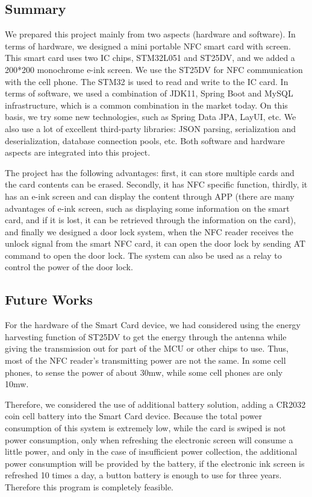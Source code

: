 \documentclass[11pt, a4paper]{article}
\begin{document}
\subsection{Summary}

We prepared this project mainly from two aspects (hardware and software). In terms of hardware, we designed a mini portable NFC smart card with screen. This smart card uses two IC chips, STM32L051 and ST25DV, and we added a 200*200 monochrome e-ink screen. We use the ST25DV for NFC communication with the cell phone. The STM32 is used to read and write to the IC card. In terms of software, we used a combination of JDK11, Spring Boot and MySQL infrastructure, which is a common combination in the market today. On this basis, we try some new technologies, such as Spring Data JPA, LayUI, etc. We also use a lot of excellent third-party libraries: JSON parsing, serialization and deserialization, database connection pools, etc. Both software and hardware aspects are integrated into this project.

The project has the following advantages: first, it can store multiple cards and the card contents can be erased. Secondly, it has NFC specific function, thirdly, it has an e-ink screen and can display the content through APP (there are many advantages of e-ink screen, such as displaying some information on the smart card, and if it is lost, it can be retrieved through the information on the card), and finally we designed a door lock system, when the NFC reader receives the unlock signal from the smart NFC card, it can open the door lock by sending AT command to open the door lock. The system can also be used as a relay to control the power of the door lock.

\subsection{Future Works}

For the hardware of the Smart Card device, we had considered using the energy harvesting function of ST25DV to get the energy through the antenna while giving the transmission out for part of the MCU or other chips to use. Thus, most of the NFC reader's transmitting power are not the same. In some cell phones, to sense the power of about 30mw, while some cell phones are only 10mw.

Therefore, we considered the use of additional battery solution, adding a CR2032 coin cell battery into the Smart Card device. Because the total power consumption of this system is extremely low, while the card is swiped is not power consumption, only when refreshing the electronic screen will consume a little power, and only in the case of insufficient power collection, the additional power consumption will be provided by the battery, if the electronic ink screen is refreshed 10 times a day, a button battery is enough to use for three years. Therefore this program is completely feasible.


\nocite{*}
\printbibliography
\end{document}
